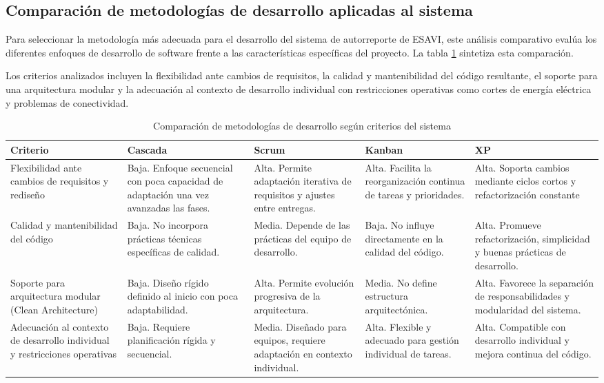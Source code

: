 \subsection{Comparación de metodologías de desarrollo aplicadas al sistema}
\label{subsection:comparacion_metodologias_sistema}

Para seleccionar la metodología más adecuada para el desarrollo del sistema de autorreporte de ESAVI, este análisis comparativo evalúa los diferentes enfoques de desarrollo de software frente a las características específicas del proyecto. La tabla \ref{tab:comparacion_metodologias_4criterios} sintetiza esta comparación.

Los criterios analizados incluyen la flexibilidad ante cambios de requisitos, la calidad y mantenibilidad del código resultante, el soporte para una arquitectura modular y la adecuación al contexto de desarrollo individual con restricciones operativas como cortes de energía eléctrica y problemas de conectividad.


\begin{table}[h!]
\centering
\renewcommand{\arraystretch}{1.3}
\begin{tabular}{|p{3.5cm}|p{2.8cm}|p{2.8cm}|p{2.8cm}|p{2.8cm}|}
\hline
\textbf{Criterio} & \textbf{Cascada} & \textbf{Scrum} & \textbf{Kanban} & \textbf{XP} \\
\hline

Flexibilidad ante cambios de requisitos y rediseño 
& Baja. Enfoque secuencial con poca capacidad de adaptación una vez avanzadas las fases. 
& Alta. Permite adaptación iterativa de requisitos y ajustes entre entregas. 
& Alta. Facilita la reorganización continua de tareas y prioridades. 
& Alta. Soporta cambios mediante ciclos cortos y refactorización constante \\
\hline

Calidad y mantenibilidad del código 
& Baja. No incorpora prácticas técnicas específicas de calidad. 
& Media. Depende de las prácticas del equipo de desarrollo. 
& Baja. No influye directamente en la calidad del código. 
& Alta. Promueve refactorización, simplicidad y buenas prácticas de desarrollo. \\
\hline

Soporte para arquitectura modular (Clean Architecture) 
& Baja. Diseño rígido definido al inicio con poca adaptabilidad. 
& Alta. Permite evolución progresiva de la arquitectura. 
& Media. No define estructura arquitectónica. 
& Alta. Favorece la separación de responsabilidades y modularidad del sistema. \\
\hline

Adecuación al contexto de desarrollo individual y restricciones operativas 
& Baja. Requiere planificación rígida y secuencial. 
& Media. Diseñado para equipos, requiere adaptación en contexto individual. 
& Alta. Flexible y adecuado para gestión individual de tareas. 
& Alta. Compatible con desarrollo individual y mejora continua del código. \\
\hline

\end{tabular}
\caption{Comparación de metodologías de desarrollo según criterios del sistema}
\label{tab:comparacion_metodologias_4criterios}
\end{table}

